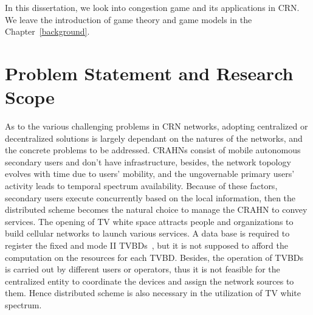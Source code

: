 In this dissertation, we look into congestion game and its applications in CRN.
We leave the introduction of game theory and game models in the Chapter~\ref{background}.



\section{Problem Statement and Research Scope}

As to the various challenging problems in CRN networks, adopting centralized or decentralized solutions is largely dependant on the natures of the networks, and the concrete problems to be addressed.
CRAHNs consist of mobile autonomous secondary users and don't have infrastructure, besides, the network topology evolves with time due to users' mobility, and the ungovernable primary users' activity leads to temporal spectrum availability. 
Because of these factors, secondary users execute concurrently based on the local information, then the distributed scheme becomes the natural choice to manage the CRAHN to convey services.
%
The opening of TV white space attracts people and organizations to build cellular networks to launch various services.
A data base is required to register the fixed and mode II TVBDs~\cite{crn_futurecellular_2014}, but it is not supposed to afford the computation on the resources for each TVBD.
Besides, the operation of TVBDs is carried out by different users or operators, thus it is not feasible for the centralized entity to coordinate the devices and assign the network sources to them.
Hence distributed scheme is also necessary in the utilization of TV white spectrum.

